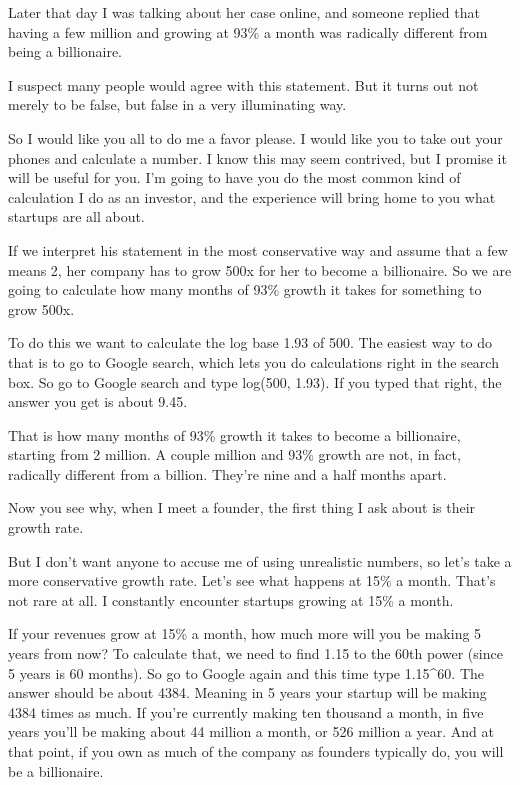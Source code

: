 \documentclass[12pt]{book}
\begin{document}
Later that day I was talking about her case online, and someone replied
that having a few million and growing at 93\% a month was radically
different from being a billionaire.

I suspect many people would agree with this statement. But it turns out
not merely to be false, but false in a very illuminating way.

So I would like you all to do me a favor please. I would like you to
take out your phones and calculate a number. I know this may seem
contrived, but I promise it will be useful for you. I'm going to have
you do the most common kind of calculation I do as an investor, and the
experience will bring home to you what startups are all about.

If we interpret his statement in the most conservative way and assume
that a few means 2, her company has to grow 500x for her to become a
billionaire. So we are going to calculate how many months of 93\% growth
it takes for something to grow 500x.

To do this we want to calculate the log base 1.93 of 500. The easiest
way to do that is to go to Google search, which lets you do calculations
right in the search box. So go to Google search and type log(500, 1.93).
If you typed that right, the answer you get is about 9.45.

That is how many months of 93\% growth it takes to become a billionaire,
starting from 2 million. A couple million and 93\% growth are not, in
fact, radically different from a billion. They're nine and a half months
apart.

Now you see why, when I meet a founder, the first thing I ask about is
their growth rate.

But I don't want anyone to accuse me of using unrealistic numbers, so
let's take a more conservative growth rate. Let's see what happens at
15\% a month. That's not rare at all. I constantly encounter startups
growing at 15\% a month.

If your revenues grow at 15\% a month, how much more will you be making
5 years from now? To calculate that, we need to find 1.15 to the 60th
power (since 5 years is 60 months). So go to Google again and this time
type 1.15\^{}60. The answer should be about 4384. Meaning in 5 years
your startup will be making 4384 times as much. If you're currently
making ten thousand a month, in five years you'll be making about 44
million a month, or 526 million a year. And at that point, if you own as
much of the company as founders typically do, you will be a billionaire.
\end{document}
